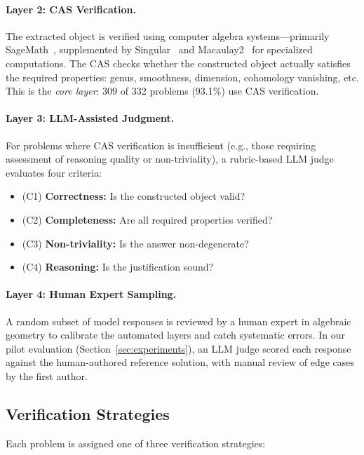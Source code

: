 \paragraph{Layer 2: CAS Verification.}
The extracted object is verified using computer algebra systems---primarily SageMath~\citep{sagemath}, supplemented by Singular~\citep{singular} and Macaulay2~\citep{macaulay2} for specialized computations.
The CAS checks whether the constructed object actually satisfies the required properties: genus, smoothness, dimension, cohomology vanishing, etc.
This is the \emph{core layer}: 309 of 332 problems (93.1\%) use CAS verification.

\paragraph{Layer 3: LLM-Assisted Judgment.}
For problems where CAS verification is insufficient (e.g., those requiring assessment of reasoning quality or non-triviality), a rubric-based LLM judge evaluates four criteria:
\begin{itemize}[nosep]
  \item (C1) \textbf{Correctness:} Is the constructed object valid?
  \item (C2) \textbf{Completeness:} Are all required properties verified?
  \item (C3) \textbf{Non-triviality:} Is the answer non-degenerate?
  \item (C4) \textbf{Reasoning:} Is the justification sound?
\end{itemize}

\paragraph{Layer 4: Human Expert Sampling.}
A random subset of model responses is reviewed by a human expert in algebraic geometry to calibrate the automated layers and catch systematic errors.
In our pilot evaluation (Section~\ref{sec:experiments}), an LLM judge scored each response against the human-authored reference solution, with manual review of edge cases by the first author.

\subsection{Verification Strategies}

Each problem is assigned one of three verification strategies:

